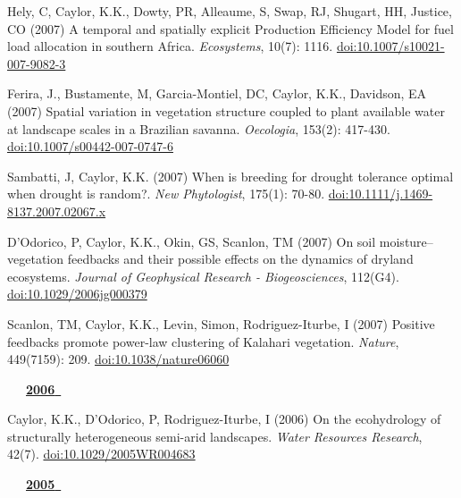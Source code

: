 \begin{etaremune}
\item Hely, C, Caylor, K.K., Dowty, PR, Alleaume, S, Swap, RJ, Shugart, HH, Justice, CO (2007) A temporal and spatially explicit Production Efficiency Model for fuel load allocation in southern Africa. \emph{Ecosystems}, 10(7): 1116. \href{https://doi.org/10.1007/s10021-007-9082-3}{doi:10.1007/s10021-007-9082-3}
\item Ferira, J., Bustamente, M, Garcia-Montiel, DC, Caylor, K.K., Davidson, EA (2007) Spatial variation in vegetation structure coupled to plant available water at landscape scales in a Brazilian savanna. \emph{Oecologia}, 153(2): 417-430. \href{https://doi.org/10.1007/s00442-007-0747-6}{doi:10.1007/s00442-007-0747-6}
\item Sambatti, J, Caylor, K.K. (2007) When is breeding for drought tolerance optimal when drought is random?. \emph{New Phytologist}, 175(1): 70-80. \href{https://doi.org/10.1111/j.1469-8137.2007.02067.x}{doi:10.1111/j.1469-8137.2007.02067.x}
\item D'Odorico, P, Caylor, K.K., Okin, GS, Scanlon, TM (2007) On soil moisture–vegetation feedbacks and their possible effects on the dynamics of dryland ecosystems. \emph{Journal of Geophysical Research - Biogeosciences}, 112(G4). \href{https://doi.org/10.1029/2006jg000379}{doi:10.1029/2006jg000379}
\item Scanlon, TM, Caylor, K.K., Levin, Simon, Rodriguez-Iturbe, I (2007) Positive feedbacks promote power-law clustering of Kalahari vegetation. \emph{Nature}, 449(7159): 209. \href{https://doi.org/10.1038/nature06060}{doi:10.1038/nature06060}

\mbox{\ \ \ \underline{\textbf{2006 }}}

\item Caylor, K.K., D'Odorico, P, Rodriguez-Iturbe, I (2006) On the ecohydrology of structurally heterogeneous semi-arid landscapes. \emph{Water Resources Research}, 42(7). \href{https://doi.org/10.1029/2005WR004683}{doi:10.1029/2005WR004683}

\mbox{\ \ \ \underline{\textbf{2005 }}}


\end{etaremune}
